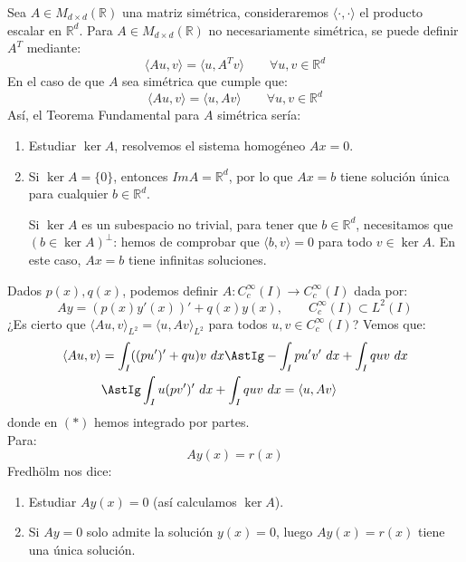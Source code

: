 \noindent
Sea $A\in M_{d\times d}(\mathbb{R})$ una matriz simétrica, consideraremos $\langle \cdot ,\cdot  \rangle $ el producto escalar en $\mathbb{R}^d$. Para $A\in M_{d\times d}(\mathbb{R})$ no necesariamente simétrica, se puede definir $A^T$ mediante:
\begin{equation*}
    \langle Au, v  \rangle  = \langle u,A^T v \rangle  \qquad \forall u,v\in \mathbb{R}^d
\end{equation*}
En el caso de que $A$ sea simétrica que cumple que:
\begin{equation*}
    \langle Au,v \rangle  = \langle u,Av \rangle  \qquad \forall u,v\in \mathbb{R}^d
\end{equation*}
Así, el Teorema Fundamental para $A$ simétrica sería:
\begin{enumerate}
    \item Estudiar $\ker A$, resolvemos el sistema homogéneo $Ax = 0$.
    \item Si $\ker A = \{0\}$, entonces $Im A = \mathbb{R}^d$, por lo que $Ax = b$ tiene solución única para cualquier $b\in \mathbb{R}^d$.

        Si $\ker A$ es un subespacio no trivial, para tener que $b\in \mathbb{R}^d$, necesitamos que $(b\in \ker A)^\perp$: hemos de comprobar que $\langle b,v \rangle =0$ para todo $v\in \ker A$. En este caso, $Ax = b$ tiene infinitas soluciones.
\end{enumerate}
Dados $p(x),q(x)$, podemos definir $A:C_c^\infty(I)\to C_c^\infty(I)$ dada por:
\begin{equation*}
    Ay = (p(x)y'(x))' + q(x)y(x), \qquad C_c^\infty(I) \subset L^2(I)
\end{equation*}
¿Es cierto que $\langle Au,v \rangle_{L^2} = \langle u,Av \rangle_{L^2}$ para todos $u,v\in C_c^\infty(I)$? Vemos que:
\begin{align*}
    \langle Au,v \rangle  &= \int_I((pu')' + qu)v~dx \AstIg -\int_I pu'v'~dx + \int_I quv~dx \\
                          &\AstIg \int_I u(pv')'~dx + \int_I quv~dx = \langle u,Av \rangle 
\end{align*}
donde en $(\ast)$ hemos integrado por partes.\\

\noindent
Para:
\begin{equation*}
    Ay(x) = r(x)
\end{equation*}
Fredhölm nos dice:
\begin{enumerate}
    \item Estudiar $Ay(x) = 0$ (así calculamos $\ker A$).
    \item Si $Ay = 0$ solo admite la solución $y(x) = 0$, luego $Ay(x) = r(x)$ tiene una única solución.
\end{enumerate}

